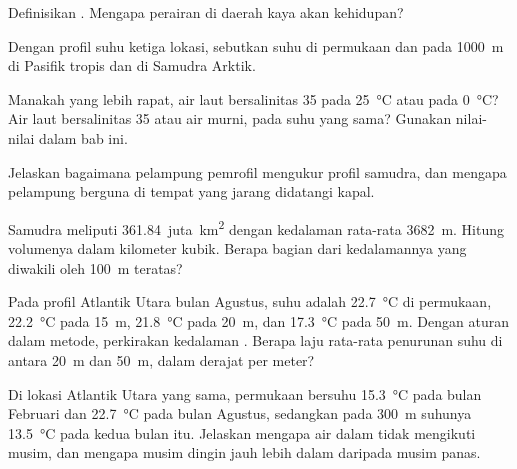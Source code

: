 \begin{exercise}[$\star$]\label{exo:g10:layered-ocean:2}
Definisikan . Mengapa perairan di daerah  kaya akan kehidupan?
\end{exercise}

\begin{exercise}[$\star$]\label{exo:g10:layered-ocean:3}
Dengan profil suhu ketiga lokasi, sebutkan suhu di permukaan dan pada
\qty{1000}{m} di Pasifik tropis dan di Samudra Arktik.
\end{exercise}

\begin{exercise}[$\star$]\label{exo:g10:layered-ocean:4}
Manakah yang lebih rapat, air laut bersalinitas 35 pada
\qty{25}{\degreeCelsius} atau pada \qty{0}{\degreeCelsius}? Air laut
bersalinitas 35 atau air murni, pada suhu yang sama? Gunakan nilai-nilai dalam
bab ini.
\end{exercise}

\begin{exercise}[$\star$]\label{exo:g10:layered-ocean:5}
Jelaskan bagaimana pelampung pemrofil mengukur profil samudra, dan mengapa
pelampung berguna di tempat yang jarang didatangi kapal.
\end{exercise}

\begin{exercise}[$\star\star$]\label{exo:g10:layered-ocean:6}
Samudra meliputi \num{361.84}~juta~\unit{km^2} dengan kedalaman rata-rata
\qty{3682}{m}. Hitung volumenya dalam kilometer kubik. Berapa bagian dari
kedalamannya yang diwakili oleh \qty{100}{m} teratas?
\end{exercise}

\begin{exercise}[$\star\star$]\label{exo:g10:layered-ocean:7}
Pada profil Atlantik Utara bulan Agustus, suhu adalah
\qty{22.7}{\degreeCelsius} di permukaan, \qty{22.2}{\degreeCelsius} pada
\qty{15}{m}, \qty{21.8}{\degreeCelsius} pada \qty{20}{m}, dan
\qty{17.3}{\degreeCelsius} pada \qty{50}{m}. Dengan aturan dalam metode,
perkirakan kedalaman . Berapa laju rata-rata penurunan suhu
di antara \qty{20}{m} dan \qty{50}{m}, dalam derajat per meter?
\end{exercise}

\begin{exercise}[$\star\star$]\label{exo:g10:layered-ocean:8}
Di lokasi Atlantik Utara yang sama, permukaan bersuhu \qty{15.3}{\degreeCelsius}
pada bulan Februari dan \qty{22.7}{\degreeCelsius} pada bulan Agustus,
sedangkan pada \qty{300}{m} suhunya \qty{13.5}{\degreeCelsius} pada kedua
bulan itu. Jelaskan mengapa air dalam tidak mengikuti musim, dan mengapa
 musim dingin jauh lebih dalam daripada 
musim panas.
\end{exercise}

